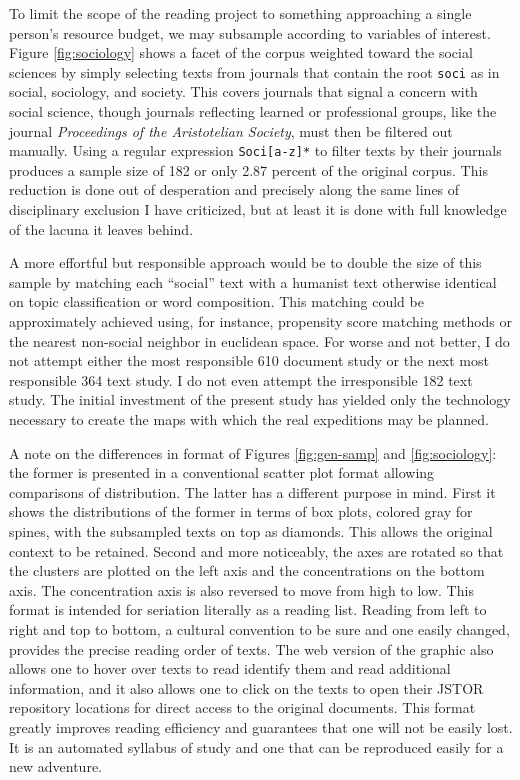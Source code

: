 \documentclass[]{book}
\theoremstyle{definition}
\theoremstyle{definition}
\theoremstyle{definition}
\theoremstyle{remark}
\begin{document}
To limit the scope of the reading project to something approaching a
single person's resource budget, we may subsample according to variables
of interest. Figure \ref{fig:sociology} shows a facet of the corpus
weighted toward the social sciences by simply selecting texts from
journals that contain the root \texttt{soci} as in social, sociology,
and society. This covers journals that signal a concern with social
science, though journals reflecting learned or professional groups, like
the journal \emph{Proceedings of the Aristotelian Society}, must then be
filtered out manually. Using a regular expression
\texttt{Soci{[}a-z{]}*} to filter texts by their journals produces a
sample size of 182 or only 2.87 percent of the original corpus. This
reduction is done out of desperation and precisely along the same lines
of disciplinary exclusion I have criticized, but at least it is done
with full knowledge of the lacuna it leaves behind.

A more effortful but responsible approach would be to double the size of
this sample by matching each ``social'' text with a humanist text
otherwise identical on topic classification or word composition. This
matching could be approximately achieved using, for instance, propensity
score matching methods or the nearest non-social neighbor in euclidean
space. For worse and not better, I do not attempt either the most
responsible 610 document study or the next most responsible 364 text
study. I do not even attempt the irresponsible 182 text study. The
initial investment of the present study has yielded only the technology
necessary to create the maps with which the real expeditions may be
planned.

A note on the differences in format of Figures \ref{fig:gen-samp} and
\ref{fig:sociology}: the former is presented in a conventional scatter
plot format allowing comparisons of distribution. The latter has a
different purpose in mind. First it shows the distributions of the
former in terms of box plots, colored gray for spines, with the
subsampled texts on top as diamonds. This allows the original context to
be retained. Second and more noticeably, the axes are rotated so that
the clusters are plotted on the left axis and the concentrations on the
bottom axis. The concentration axis is also reversed to move from high
to low. This format is intended for seriation literally as a reading
list. Reading from left to right and top to bottom, a cultural
convention to be sure and one easily changed, provides the precise
reading order of texts. The web version of the graphic also allows one
to hover over texts to read identify them and read additional
information, and it also allows one to click on the texts to open their
JSTOR repository locations for direct access to the original documents.
This format greatly improves reading efficiency and guarantees that one
will not be easily lost. It is an automated syllabus of study and one
that can be reproduced easily for a new adventure.
\end{document}
